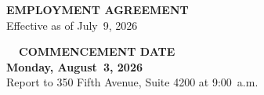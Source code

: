 \documentclass[11pt]{article}
\begin{document}
\begin{center}
  {\huge\bfseries\color{accent}EMPLOYMENT AGREEMENT}\\[4pt]
  {\large\color{medium}Effective as of July~9, 2026}
\end{center}

\begin{commencebox}
  \centering
  {\large\bfseries\color{accent}\faCalendarCheck\ \ COMMENCEMENT DATE}\\[5pt]
  {\Large\bfseries\color{dark}Monday, August~3, 2026}\\[2pt]
  {\small\color{medium}Report to 350 Fifth Avenue, Suite 4200 at 9:00~a.m.}
\end{commencebox}












\end{document}
